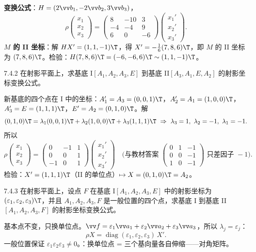 \textbf{变换公式}：$H=(2\vv b_1,-2\vv b_2,3\vv b_3)$，
\[
\rho\begin{pmatrix}x_1\\x_2\\x_3\end{pmatrix}=\begin{pmatrix}8&-10&3\\-4&-4&9\\6&0&-6\end{pmatrix}\begin{pmatrix}x_1'\\x_2'\\x_3'\end{pmatrix}.
\]
\textbf{$M$ 的 II 坐标}：解 $HX'=(1,1,-1)\T$，得 $X'=-\frac16(7,8,6)\T$，即 $M$ 的 II 坐标为 $(7,8,6)\T$。检验：$H(7,8,6)\T=(-6,-6,6)\T\sim(1,1,-1)\T$。\checkmark

\begin{ex}{7.4.2}
在射影平面上，求基底 I$[A_1,A_2,A_3,E]$ 到基底 II$[A_3,A_1,E,A_2]$ 的射影坐标变换公式。
\end{ex}
\jie 新基底的四个点在 I 中的坐标：$A_1'=A_3=(0,0,1)\T$，$A_2'=A_1=(1,0,0)\T$，$A_3'=E=(1,1,1)\T$，$E'=A_2=(0,1,0)\T$。解
\[
(0,1,0)\T=\lambda_1(0,0,1)\T+\lambda_2(1,0,0)\T+\lambda_3(1,1,1)\T\ \Rightarrow\ \lambda_3=1,\ \lambda_2=-1,\ \lambda_1=-1 .
\]
所以
\[
\rho\begin{pmatrix}x_1\\x_2\\x_3\end{pmatrix}=\begin{pmatrix}0&-1&1\\0&0&1\\-1&0&1\end{pmatrix}\begin{pmatrix}x_1'\\x_2'\\x_3'\end{pmatrix}
\quad\Big(\text{与教材答案 }\begin{pmatrix}0&1&-1\\0&0&-1\\1&0&-1\end{pmatrix}\text{ 只差因子 }-1\Big).
\]
检验：$X'=(1,1,1)\T$（II 的单位点）$\mapsto X=(0,1,0)\T=A_2$。\checkmark

\begin{ex}{7.4.3}
在射影平面上，设点 $F$ 在基底 I$[A_1,A_2,A_3,E]$ 中的射影坐标为 $(\varepsilon_1,\varepsilon_2,\varepsilon_3)\T$，并且 $A_1,A_2,A_3,F$ 是一般位置的四个点，求基底 I 到基底 II$[A_1,A_2,A_3,F]$ 的射影坐标变换公式。
\end{ex}
\jie 基本点不变，只换单位点。$\vv f=\varepsilon_1\vv a_1+\varepsilon_2\vv a_2+\varepsilon_3\vv a_3$，所以 $\lambda_j=\varepsilon_j$：
\[
\rho X=\operatorname{diag}(\varepsilon_1,\varepsilon_2,\varepsilon_3)\,X' .
\]
一般位置保证 $\varepsilon_1\varepsilon_2\varepsilon_3\neq0$。：换单位点 = 三个基向量各自伸缩——对角矩阵。

